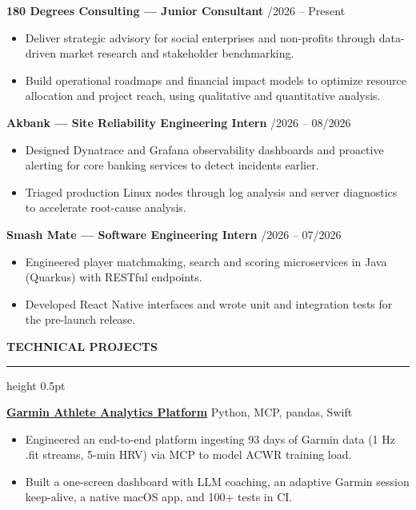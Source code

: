 \documentclass[a4paper]{article}
\newcommand{\sechead}[1]{%
    \vspace{11.0pt}%
    {\fontsize{10.0}{12.0}\textbf{\MakeUppercase{#1}}\par}%
    \vspace{2.4pt}%
    \hrule height 0.5pt%
    \vspace{4.6pt}%
}
\newcommand{\entry}[2]{%
    {\fontsize{9.2}{11.5}\textbf{#1}} \hfill {\fontsize{8.4}{10.6}\selectfont #2} \par
}
\newcommand{\desc}[1]{%
    {\fontsize{8.0}{10.3}\selectfont #1}%
}
\begin{document}
\entry{180 Degrees Consulting \textnormal{--- Junior Consultant}}{10/2026 -- Present}
\begin{itemize}[leftmargin=1.1em, itemsep=1.2pt, parsep=0pt, topsep=1.2pt]
   \item \desc{Deliver strategic advisory for social enterprises and non-profits through data-driven market research and stakeholder benchmarking.}
   \item \desc{Build operational roadmaps and financial impact models to optimize resource allocation and project reach, using qualitative and quantitative analysis.}
\end{itemize}
\vspace{5.0pt}

\entry{Akbank \textnormal{--- Site Reliability Engineering Intern}}{07/2026 -- 08/2026}
\begin{itemize}[leftmargin=1.1em, itemsep=1.2pt, parsep=0pt, topsep=1.2pt]
   \item \desc{Designed Dynatrace and Grafana observability dashboards and proactive alerting for core banking services to detect incidents earlier.}
   \item \desc{Triaged production Linux nodes through log analysis and server diagnostics to accelerate root-cause analysis.}
\end{itemize}
\vspace{5.0pt}

\entry{Smash Mate \textnormal{--- Software Engineering Intern}}{06/2026 -- 07/2026}
\begin{itemize}[leftmargin=1.1em, itemsep=1.2pt, parsep=0pt, topsep=1.2pt]
   \item \desc{Engineered player matchmaking, search and scoring microservices in Java (Quarkus) with RESTful endpoints.}
   \item \desc{Developed React Native interfaces and wrote unit and integration tests for the pre-launch release.}
\end{itemize}

\sechead{Technical Projects}

\entry{\href{https://github.com/yigitsarpavci/garmin-athlete-analytics-platform}{Garmin Athlete Analytics Platform}}{Python, MCP, pandas, Swift}
\begin{itemize}[leftmargin=1.1em, itemsep=1.2pt, parsep=0pt, topsep=1.2pt]
   \item \desc{Engineered an end-to-end platform ingesting 93 days of Garmin data (1 Hz .fit streams, 5-min HRV) via MCP to model ACWR training load.}
   \item \desc{Built a one-screen dashboard with LLM coaching, an adaptive Garmin session keep-alive, a native macOS app, and 100+ tests in CI.}
\end{itemize}
\vspace{5.0pt}
\end{document}
